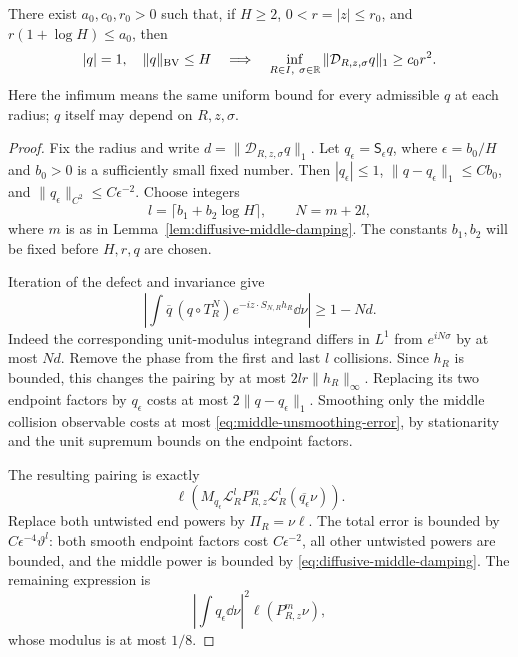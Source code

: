 \begin{theorem}
\label{thm:near-origin-circle-defect}
There exist $a_0,c_0,r_0>0$ such that, if $H\ge2$,
$0<r=|z|\le r_0$, and $r(1+\log H)\le a_0$, then
\begin{equation}\label{eq:near-origin-circle-defect}
 |q|=1,\quad \|q\|_{\mathrm{BV}}\le H
 \quad\Longrightarrow\quad
 \inf_{R\in I,\ \sigma\in\R}
        \|\mathcal D_{R,z,\sigma}q\|_1\ge c_0r^2.
\end{equation}
Here the infimum means the same uniform bound for every admissible
$q$ at each radius; $q$ itself may depend on $R,z,\sigma$.
\end{theorem}
\begin{proof}
Fix the radius and write $d=\|\mathcal D_{R,z,\sigma}q\|_1$.
Let $q_\epsilon=\mathsf S_\epsilon q$, where
$\epsilon=b_0/H$ and $b_0>0$ is a sufficiently small fixed number.
Then $|q_\epsilon|\le1$, $\|q-q_\epsilon\|_1\le Cb_0$, and
$\|q_\epsilon\|_{C^2}\le C\epsilon^{-2}$.
Choose integers
\[
 l=\lceil b_1+b_2\log H\rceil,\qquad N=m+2l,
\]
where $m$ is as in Lemma~\ref{lem:diffusive-middle-damping}.
The constants $b_1,b_2$ will be fixed before $H,r,q$ are chosen.

Iteration of the defect and invariance give
\begin{equation}\label{eq:near-origin-lower-pairing}
 \left|\int\overline q\,(q\circ T_R^N)
              e^{-iz\cdot S_{N,R}h_R}\dd\nu\right|\ge1-Nd.
\end{equation}
Indeed the corresponding unit-modulus integrand differs in $L^1$
from $e^{iN\sigma}$ by at most $Nd$.
Remove the phase from the first and last $l$ collisions. Since $h_R$
is bounded, this changes the pairing by at most $2lr\|h_R\|_\infty$.
Replacing its two endpoint factors by $q_\epsilon$ costs at most
$2\|q-q_\epsilon\|_1$. Smoothing only the middle collision observable
costs at most \eqref{eq:middle-unsmoothing-error}, by stationarity
and the unit supremum bounds on the endpoint factors.

The resulting pairing is exactly
\begin{equation}\label{eq:untwisted-end-word}
 \ell\left(M_{q_\epsilon}\mathcal L_R^l
                 P_{R,z}^m\mathcal L_R^l(\overline{q_\epsilon}\nu)\right).
\end{equation}
Replace both untwisted end powers by $\Pi_R=\nu\ell$.
The total error is bounded by
$C\epsilon^{-4}\vartheta^l$: both smooth endpoint factors cost
$C\epsilon^{-2}$, all other untwisted powers are bounded, and the
middle power is bounded by \eqref{eq:diffusive-middle-damping}.
The remaining expression is
\[
 \left|\int q_\epsilon\dd\nu\right|^2
                          \ell(P_{R,z}^m\nu),
\]
whose modulus is at most $1/8$.


\end{proof}
